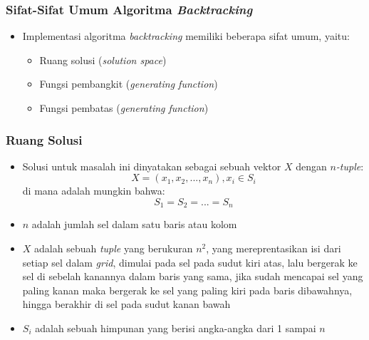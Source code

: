 \documentclass{beamer}
\begin{document}
\begin{frame}
\frametitle{Sifat-Sifat Umum Algoritma \protect\textit{Backtracking}}
\begin{itemize}
\item Implementasi algoritma \textit{backtracking} memiliki beberapa sifat umum, yaitu:
	\begin{itemize}
		\item Ruang solusi (\textit{solution space})
		\item Fungsi pembangkit (\textit{generating function})
		\item Fungsi pembatas (\textit{generating function})
	\end{itemize}
\end{itemize}
\end{frame}

\note{

}

\begin{frame}
\frametitle{Ruang Solusi}
\begin{itemize}
\item Solusi untuk masalah ini dinyatakan sebagai sebuah vektor \begin{math}X\end{math} dengan \textit{\begin{math}n\end{math}-tuple}:
\begin{displaymath}
X = (x_1, x_2, ..., x_n), x_i \in S_i
\end{displaymath}
di mana adalah mungkin bahwa:
\begin{displaymath}
S_1 = S_2 = ... = S_n
\end{displaymath}
\item \begin{math}n\end{math} adalah jumlah sel dalam satu baris atau kolom
\item \begin{math}X\end{math} adalah sebuah \textit{tuple} yang berukuran \begin{math}n^2\end{math}, yang mereprentasikan isi dari setiap sel dalam \textit{grid}, dimulai pada sel pada sudut kiri atas, lalu bergerak ke sel di sebelah kanannya dalam baris yang sama, jika sudah mencapai sel yang paling kanan maka bergerak ke sel yang paling kiri pada baris dibawahnya, hingga berakhir di sel pada sudut kanan bawah
\item \begin{math}S_i\end{math} adalah sebuah himpunan yang berisi angka-angka dari 1 sampai \begin{math}n\end{math}
\end{itemize}
\end{frame}
\end{document}
